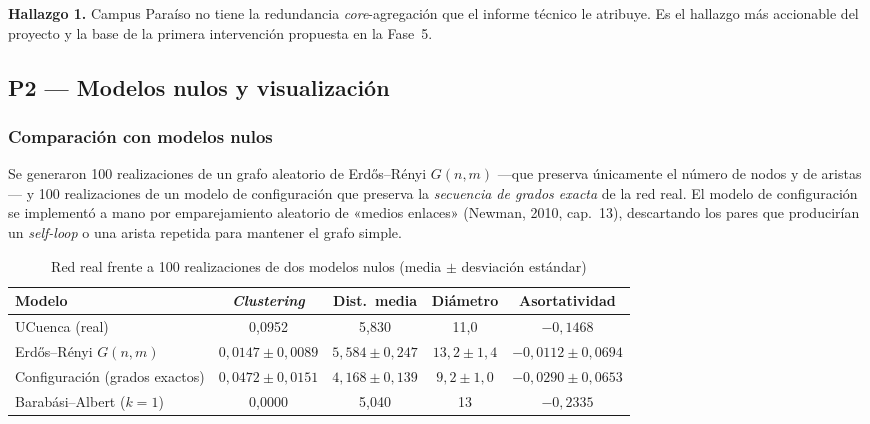 \documentclass[10pt,a4paper]{extarticle}
\begin{document}
\begin{clave}
\textbf{Hallazgo 1.} Campus Paraíso no tiene la redundancia \textit{core}-agregación que el
informe técnico le atribuye. Es el hallazgo más accionable del proyecto y la base de la
primera intervención propuesta en la Fase~5.
\end{clave}

\subsection{P2 --- Modelos nulos y visualización}
\label{sec:p2}

\subsubsection{Comparación con modelos nulos}

Se generaron 100 realizaciones de un grafo aleatorio de Erdős--Rényi $G(n,m)$ ---que
preserva únicamente el número de nodos y de aristas--- y 100 realizaciones de un modelo de
configuración que preserva la \textit{secuencia de grados exacta} de la red real. El
modelo de configuración se implementó a mano por emparejamiento aleatorio de
«medios enlaces» (Newman, 2010, cap.~13), descartando los pares que producirían un
\textit{self-loop} o una arista repetida para mantener el grafo simple.

\begin{table}[H]
\centering
\caption{Red real frente a 100 realizaciones de dos modelos nulos (media $\pm$ desviación estándar)}
\label{tab:nulos}
\small
\begin{adjustbox}{max width=\textwidth}
\begin{tabular}{lcccc}
\toprule
\textbf{Modelo} & \textbf{\textit{Clustering}} & \textbf{Dist.\ media} & \textbf{Diámetro} & \textbf{Asortatividad} \\
\midrule
UCuenca (real)                    & 0,0952 & 5,830 & 11,0 & $-0{,}1468$ \\
Erdős--Rényi $G(n,m)$             & $0{,}0147 \pm 0{,}0089$ & $5{,}584 \pm 0{,}247$ & $13{,}2 \pm 1{,}4$ & $-0{,}0112 \pm 0{,}0694$ \\
Configuración (grados exactos)    & $0{,}0472 \pm 0{,}0151$ & $4{,}168 \pm 0{,}139$ & $9{,}2 \pm 1{,}0$ & $-0{,}0290 \pm 0{,}0653$ \\
Barabási--Albert ($k=1$)          & 0,0000 & 5,040 & 13 & $-0{,}2335$ \\
\bottomrule
\end{tabular}
\end{adjustbox}
\end{table}
\end{document}
